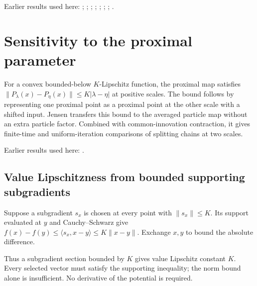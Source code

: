 \documentclass[11pt,a4paper]{report}
\begin{document}
Earlier results used here: \cite[Section~3.17.3]{LangevinLean2026ULASC}; \cite[Section~3.17.4]{LangevinLean2026ULASC}; \cite[Section~3.21.2]{LangevinLean2026ULASC}; \cite[Section~3.1.1]{LangevinLean2026IPLA}; \cite[Section~3.1.6]{LangevinLean2026IPLA}; \cite[Section~3.3.1]{LangevinLean2026IPLA}; \cite[Section~3.3.2]{LangevinLean2026IPLA}; \cite[Section~3.5.1]{LangevinLean2026IPLA}.
\section{\texorpdfstring{Sensitivity to the proximal parameter}{Sensitivity to the proximal parameter}}
\label{proof-module-ProximalLangevin-ProxParameter-lean}


For a convex bounded-below \(K\)-Lipschitz function, the proximal map satisfies \(\|P_\lambda(x)-P_\eta(x)\|\le K|\lambda-\eta|\) at positive scales. The bound follows by representing one proximal point as a proximal point at the other scale with a shifted input. Jensen transfers this bound to the averaged particle map without an extra particle factor. Combined with common-innovation contraction, it gives finite-time and uniform-iteration comparisons of splitting chains at two scales.



Earlier results used here: \cite[Section~3.15]{LangevinLean2026ULASC}.
\subsection{\texorpdfstring{Value Lipschitzness from bounded supporting subgradients}{Value Lipschitzness from bounded supporting subgradients}}
\label{report-step-ProximalLangevin-ProxParameter-lean-1}


Suppose a subgradient \(s_x\) is chosen at every point with \(\|s_x\|\le K\). Its support evaluated at \(y\) and Cauchy–Schwarz give \(f(x)-f(y)\le\langle s_x,x-y\rangle\le K\|x-y\|\). Exchange \(x,y\) to bound the absolute difference.



Thus a subgradient section bounded by \(K\) gives value Lipschitz constant \(K\). Every selected vector must satisfy the supporting inequality; the norm bound alone is insufficient. No derivative of the potential is required.
\end{document}
